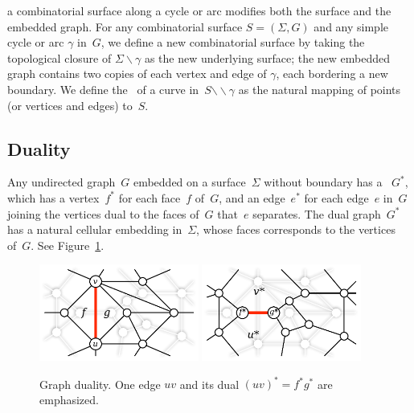 \documentclass[letterpaper,review]{siamart190516}
\def\snip{\mathbin{\raisebox{0.15ex}{\rotatebox[origin=c]{60}{\Rightscissors}\!}}}
\def\snip{\mathbin{\backslash\!\!\backslash}}
\begin{document}
 a combinatorial surface along a cycle or arc modifies both the surface and the embedded graph.
For any combinatorial surface $S = (\Sigma, G)$ and any simple cycle or arc $\gamma$ in~$G$, we define a new combinatorial surface \EMPH{$S \snip \gamma$} by taking the topological closure of $\Sigma \backslash \gamma$ as the new underlying surface; the new embedded graph contains two copies of each vertex and edge of $\gamma$, each bordering a new boundary.
We define the~ of a curve in~$S \snip \gamma$ as the natural mapping of points (or vertices and edges) to~$S$. 

\subsection{Duality}


Any undirected graph~$G$ embedded on a surface~$\Sigma$ without boundary has a
~$G^*$, which has a vertex~$f^*$ for each face~$f$ of~$G$,
and an edge~$e^*$ for each edge~$e$ in~$G$ joining the vertices dual to the
faces of~$G$ that~$e$ separates. The dual graph~$G^*$ has a natural cellular
embedding in~$\Sigma$, whose faces corresponds to the vertices of~$G$.
See Figure~\ref{fig:prelims_primaldual}.


\begin{figure}[ht]
\centering
\includegraphics[height=1.25in]{Fig/primal}\quad
\includegraphics[height=1.25in]{Fig/dual}
\caption{Graph duality.  One edge $uv$ and its dual $(uv)^* =
f^*g^*$ are emphasized.} \label{fig:prelims_primaldual}
\end{figure}
\end{document}
